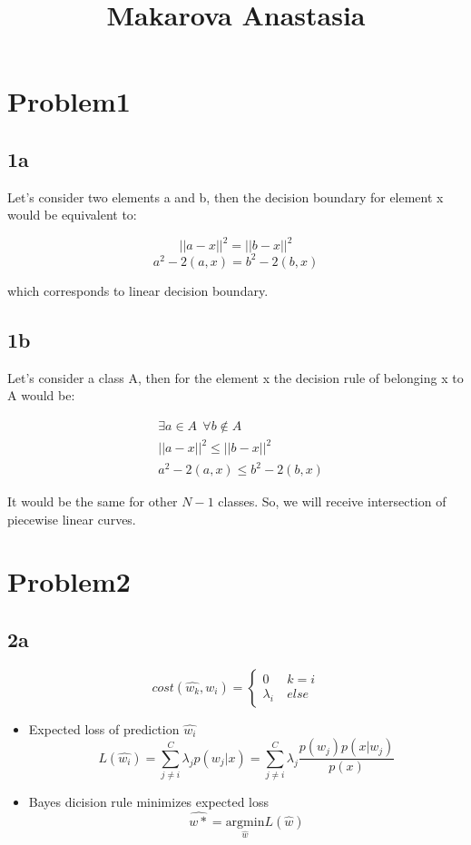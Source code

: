 \documentclass[12pt]{article}
\renewcommand{\omega}{w}
\begin{document}
\title{Makarova Anastasia}

\section{Problem1}

\subsection{1a}
Let's consider two elements a and b, then the decision boundary for element x would be equivalent to:

$$||a -x||^2 = ||b -x||^2$$
$$a^2 - 2(a,x) = b^2 - 2(b,x)$$

which corresponds to linear decision boundary.

\subsection{1b}

Let's consider a class A, then for the element x the decision rule of belonging x to A would be:

\begin{equation*}
\begin{aligned}
& \exists a \in A \ \  \forall b \notin A \\ 	
& ||a -x||^2 \leq ||b -x||^2 \\
& a^2 - 2(a,x) \leq b^2 - 2(b,x)
\end{aligned}
\end{equation*}

It would be the same for other $N - 1$ classes. So, we will receive intersection of piecewise linear curves.

\section{Problem2}

\subsection{2a}
%

\begin{equation*}
cost(\hat{\omega_k}, \omega_i) = 
 \begin{cases}
   0 &\ k = i\\
   \lambda_i &\ else
 \end{cases}
\end{equation*}

\begin{itemize}
	\item Expected loss of prediction $\hat{\omega_i}$ 
	$$L(\hat{\omega_i}) = \sum_{j \ne i}^C \lambda_j p(\omega_j|x) = \sum_{j \ne i}^C \lambda_j \frac {p(\omega_j)p(x|\omega_j)}{p(x)}$$ 
	
	\item Bayes dicision rule minimizes expected loss
	$$\hat{\omega*} = \underset{\hat{\omega}}{\text{argmin}} L(\hat{\omega})$$
\end{itemize}
\end{document}
